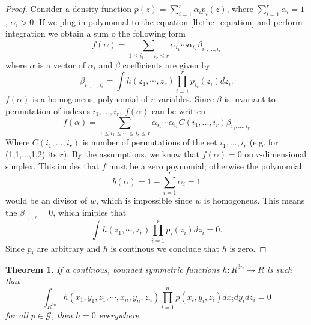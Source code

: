 \documentclass{article}
\newtheorem{Theorem}{Theorem}
\begin{document}
\begin{proof}
 Consider a density function $p(z) = \sum_{i=1}^{r} \alpha_{i} p_i(z)$, where $\sum_{i=1}^r \alpha_i=1$ , $\alpha_i>0$. If we plug in polynomial to the  equation \ref{lb:the_equation} and perform integration we obtain a sum o the following form
 \[
  f(\alpha) = \sum_{1 \leq i_1, \cdots , i_r \leq r} \alpha_{i_1} \cdots \alpha_{i_r} \beta_{i_1,...,i_r} 
 \]
where $\alpha$ is a vector of $\alpha_i$ and $\beta$ coefficients are given by
 \[
  \beta_{i_1,...,i_r} = \int  h(z_1,\cdots,z_r) \prod_{i=1}^r p_{i_r}(z_i) d z_i.
 \]
$f(\alpha)$ is a homogoneus, polynomial of $r$ variables. Since $\beta$ is invariant to permutation of indexes $i_1,...,i_r$,
$f(\alpha)$ can be written
\[
  f(\alpha) = \sum_{1 \leq i_1 \leq  \cdots \leq i_r \leq r} \alpha_{i_1} \cdots \alpha_{i_r}  C(i_1,...,i_r) \beta_{i_1,...,i_r} 
\]
Where $C(i_1,...,i_r)$ is number of permutations of the set $i_1,...,i_r$ (e.g. for (1,1,...,1,2) its $r$). By the assumptions, we know that $f(\alpha) =0 $ on $r$-dimensional simplex. This imples that $f$ must be a zero poynomial; otherwise the polynomial 
\[
b(\alpha) = 1 -  \sum_{i=1}^r \alpha_i=1
\]
would be an divisor of $w$, which is impossible since $w$ is homogoneus. This means the $\beta_{1,\cdot,r} = 0$, which imiples that
\[
  \int  h(z_1,\cdots,z_r) \prod_{i=1}^r p_{i}(z_i) d z_i =0.
\]
Since $p_{i}$ are arbitrary and $h$ is continous we conclude that $h$ is zero.
\end{proof}




\begin{Theorem}
\label{th:1}
If a continous, bounded symmetric functions $h : R^{3n} \to R$ is such that 
\[
 \int_{R^{3n}} h(x_1,y_1,z_1,\cdots,x_n,y_n,z_n) \prod_{i=1}^n p(x_i,y_i,z_i) d x_i d y_i d z_i = 0
\]
for all $p \in \mathcal G$, then $h=0$ everywhere.
\end{Theorem}
\end{document}
